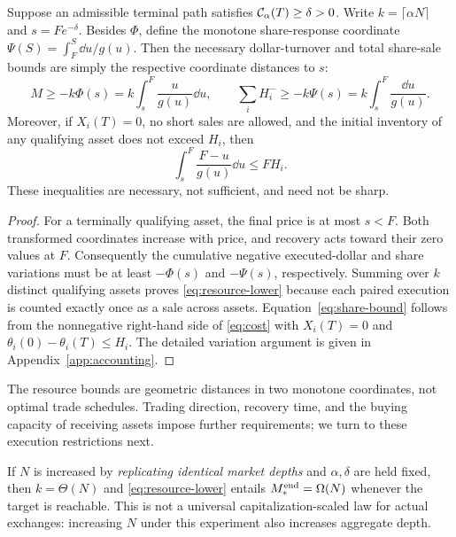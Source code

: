 \documentclass[review,hidelinks,onefignum,onetabnum]{siamonline250211}
\begin{document}
\begin{theorem}\label{thm:resource}
Suppose an admissible terminal path satisfies $\mathcal{C}_\alpha(T)\ge\delta>0$. Write $k=\lceil\alpha N\rceil$ and $s=Fe^{-\delta}$. Besides $\Phi$, define the monotone share-response coordinate $\Psi(S)=\int_F^S\dd u/g(u)$. Then the necessary dollar-turnover and total share-sale bounds are simply the respective coordinate distances to $s$:
\begin{equation}\label{eq:resource-lower}
\boxed{M\ge -k\Phi(s)=k\int_s^F\frac{u}{g(u)}\dd u,\qquad
\sum_iH_i^-\ge -k\Psi(s)=k\int_s^F\frac{\dd u}{g(u)}.}
\end{equation}
Moreover, if $X_i(T)=0$, no short sales are allowed, and the initial inventory of any qualifying asset does not exceed $H_i$, then
\begin{equation}\label{eq:share-bound}
\boxed{\int_s^F\frac{F-u}{g(u)}\dd u\le FH_i.}
\end{equation}
These inequalities are necessary, not sufficient, and need not be sharp.
\end{theorem}
\begin{proof}
For a terminally qualifying asset, the final price is at most $s<F$. Both transformed coordinates increase with price, and recovery acts toward their zero values at $F$. Consequently the cumulative negative executed-dollar and share variations must be at least $-\Phi(s)$ and $-\Psi(s)$, respectively. Summing over $k$ distinct qualifying assets proves \eqref{eq:resource-lower} because each paired execution is counted exactly once as a sale across assets. Equation~\eqref{eq:share-bound} follows from the nonnegative right-hand side of \eqref{eq:cost} with $X_i(T)=0$ and $\theta_i(0)-\theta_i(T)\le H_i$. The detailed variation argument is given in Appendix~\ref{app:accounting}.
\end{proof}

The resource bounds are geometric distances in two monotone coordinates, not optimal trade schedules. Trading direction, recovery time, and the buying capacity of receiving assets impose further requirements; we turn to these execution restrictions next.

If $N$ is increased by \emph{replicating identical market depths} and $\alpha,\delta$ are held fixed, then $k=\Theta(N)$ and \eqref{eq:resource-lower} entails $M_*^{\rm end}=\Omega(N)$ whenever the target is reachable. This is not a universal capitalization-scaled law for actual exchanges: increasing $N$ under this experiment also increases aggregate depth.
\end{document}
